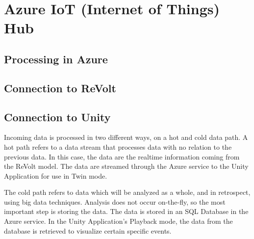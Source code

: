 \chapter{Azure IoT (Internet of Things) Hub}
\section{Processing in Azure}

\section{Connection to ReVolt}

\section{Connection to Unity}
Incoming data is processed in two different ways, on a hot and cold data path. A hot path refers to a data stream that processes data with no relation to the previous data. In this case, the data are the realtime information coming from the ReVolt model. The data are streamed through the Azure service to the Unity Application for use in Twin mode.

The cold path refers to data which will be analyzed as a whole, and in retrospect, using big data techniques. Analysis does not occur on-the-fly, so the most important step is storing the data. The data is stored in an SQL Database in the Azure service. In the Unity Application's Playback mode, the data from the database is retrieved to visualize certain specific events.
